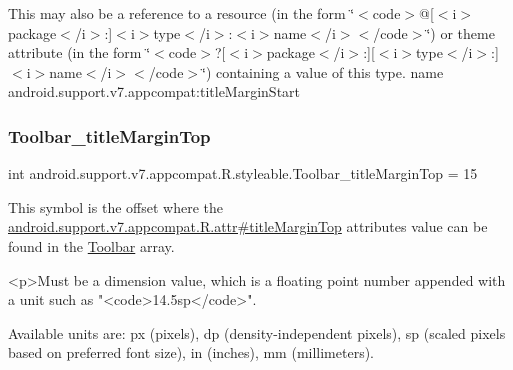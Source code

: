 This may also be a reference to a resource (in the form \char`\"{}$<$code$>$@\mbox{[}$<$i$>$package$<$/i$>$\+:\mbox{]}$<$i$>$type$<$/i$>$\+:$<$i$>$name$<$/i$>$$<$/code$>$\char`\"{}) or theme attribute (in the form \char`\"{}$<$code$>$?\mbox{[}$<$i$>$package$<$/i$>$\+:\mbox{]}\mbox{[}$<$i$>$type$<$/i$>$\+:\mbox{]}$<$i$>$name$<$/i$>$$<$/code$>$\char`\"{}) containing a value of this type.  name android.\+support.\+v7.\+appcompat\+:title\+Margin\+Start \mbox{\label{classandroid_1_1support_1_1v7_1_1appcompat_1_1R_1_1styleable_a321e1d73a518a11499a1757e88716f30}} 
\subsubsection{\texorpdfstring{Toolbar\+\_\+title\+Margin\+Top}{Toolbar\_titleMarginTop}}
{\footnotesize\ttfamily int android.\+support.\+v7.\+appcompat.\+R.\+styleable.\+Toolbar\+\_\+title\+Margin\+Top = 15\hspace{0.3cm}{\ttfamily [static]}}

This symbol is the offset where the \hyperlink{classandroid_1_1support_1_1v7_1_1appcompat_1_1R_1_1attr_a73f7b3964dcf1c57c0aae23104349f19}{android.\+support.\+v7.\+appcompat.\+R.\+attr\#title\+Margin\+Top} attribute\textquotesingle{}s value can be found in the \hyperlink{classandroid_1_1support_1_1v7_1_1appcompat_1_1R_1_1styleable_a2daba9587ef9f700f2d54cf13435cb32}{Toolbar} array.

\begin{DoxyVerb}      <p>Must be a dimension value, which is a floating point number appended with a unit such as "<code>14.5sp</code>".
\end{DoxyVerb}
 Available units are\+: px (pixels), dp (density-\/independent pixels), sp (scaled pixels based on preferred font size), in (inches), mm (millimeters). 

